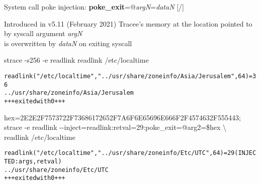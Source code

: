 \documentclass[unicode,aspectratio=169,xcolor={table,dvipsnames,usernames}]{beamer}
\begin{document}
\begin{frame}[fragile]{System call poke injection: \textbf{poke\_exit}=@\textit{argN}=\textit{dataN} \hfill [\insertframenumber/\inserttotalframenumber]}
\large
\begin{block}{Introduced in v5.11 (February 2021)}
Tracee's memory at the location pointed to by syscall argument \textit{argN} \\ is overwritten by \textit{dataN} on exiting syscall
\end{block}

\begin{block}{strace -s256 -e readlink readlink /etc/localtime}
\small
\begin{alltt}
readlink("/etc/localtime", "../usr/share/zoneinfo/Asia/Jerusalem", 64) = 36
../usr/share/zoneinfo/Asia/Jerusalem
+++ exited with 0 +++
\end{alltt}
\end{block}

\begin{block}{hex=2E2E2F7573722F73686172652F7A6F6E65696E666F2F4574632F555443; \\ strace -e readlink -{}-inject=readlink:retval=29:poke\_exit=@arg2=\$hex \textbackslash \\ readlink /etc/localtime}
\scriptsize
\begin{alltt}
readlink("/etc/localtime", "../usr/share/zoneinfo/Etc/UTC", 64) = 29 (INJECTED: args, retval)
../usr/share/zoneinfo/Etc/UTC
+++ exited with 0 +++
\end{alltt}
\end{block}
\end{frame}
\end{document}
